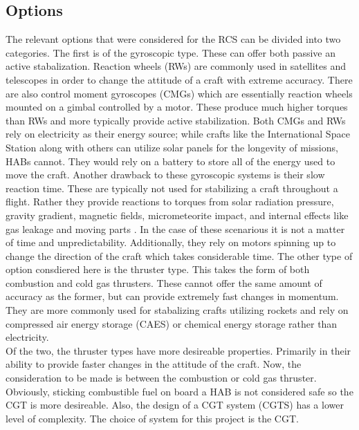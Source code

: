 \subsection{Options}
The relevant options that were considered for the RCS can be divided into two categories. The first is of the gyroscopic type. These can offer both passive an active stabalization. Reaction wheels (RWs) are commonly used in satellites and telescopes in order to change the attitude of a craft with extreme accuracy. There are also control moment gyroscopes (CMGs) which are essentially reaction wheels mounted on a gimbal controlled by a motor. These produce much higher torques than RWs and more typically provide active stabilization. Both CMGs and RWs rely on electricity as their energy source; while crafts like the International Space Station along with others can utilize solar panels for the longevity of missions, HABs cannot. They would rely on a battery to store all of the energy used to move the craft. Another drawback to these gyroscopic systems is their slow reaction time. These are typically not used for stabilizing a craft throughout a flight. Rather they provide reactions to torques from solar radiation pressure, gravity gradient, magnetic fields, micrometeorite impact, and internal effects like gas leakage and moving parts \cite{electricvthruster}. In the case of these scenarious it is not a matter of time and unpredictability. Additionally, they rely on motors spinning up to change the direction of the craft which takes considerable time. The other type of option consdiered here is the thruster type. This takes the form of both combustion and cold gas thrusters. These cannot offer the same amount of accuracy as the former, but can provide extremely fast changes in momentum. They are more commonly used for stabalizing crafts utilizing rockets and rely on compressed air energy storage (CAES) or chemical energy storage rather than electricity.\\
Of the two, the thruster types have more desireable properties. Primarily in their ability to provide faster changes in the attitude of the craft. Now, the consideration to be made is between the combustion or cold gas thruster. Obviously, sticking combustible fuel on board a HAB is not considered safe so the CGT is more desireable. Also, the design of a CGT system (CGTS) has a lower level of complexity. The choice of system for this project is the CGT.
